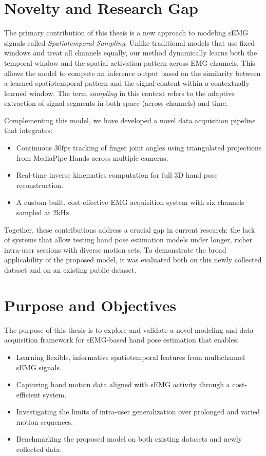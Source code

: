 \section{Novelty and Research Gap}

The primary contribution of this thesis is a new approach to modeling sEMG signals called \textit{Spatiotemporal Sampling}. Unlike traditional models that use fixed windows and treat all channels equally, our method dynamically learns both the temporal window and the spatial activation pattern across EMG channels. This allows the model to compute an inference output based on the similarity between a learned spatiotemporal pattern and the signal content within a contextually learned window. The term \textit{sampling} in this context refers to the adaptive extraction of signal segments in both space (across channels) and time.

Complementing this model, we have developed a novel data acquisition pipeline that integrates:
\begin{itemize}
    \item Continuous 30fps tracking of finger joint angles using triangulated projections from MediaPipe Hands across multiple cameras.
    \item Real-time inverse kinematics computation for full 3D hand pose reconstruction.
    \item A custom-built, cost-effective EMG acquisition system with six channels sampled at 2kHz.
\end{itemize}

Together, these contributions address a crucial gap in current research: the lack of systems that allow testing hand pose estimation models under longer, richer intra-user sessions with diverse motion sets. To demonstrate the broad applicability of the proposed model, it was evaluated both on this newly collected dataset and on an existing public dataset.

\section{Purpose and Objectives}

The purpose of this thesis is to explore and validate a novel modeling and data acquisition framework for sEMG-based hand pose estimation that enables:
\begin{itemize}
    \item Learning flexible, informative spatiotemporal features from multichannel sEMG signals.
    \item Capturing hand motion data aligned with sEMG activity through a cost-efficient system.
    \item Investigating the limits of intra-user generalization over prolonged and varied motion sequences.
    \item Benchmarking the proposed model on both existing datasets and newly collected data.
\end{itemize}

